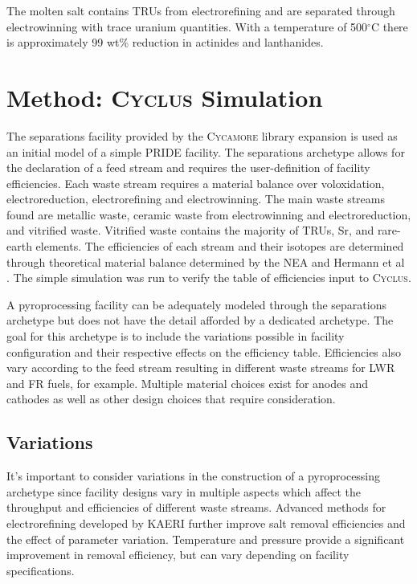 \documentclass{anstrans}
\newcommand{\Cyclus}{\textsc{Cyclus}\xspace}%
\newcommand{\Cycamore}{\textsc{Cycamore}\xspace}%
\begin{document}
The molten salt contains TRUs from electrorefining and are separated through electrowinning with trace uranium quantities. With a temperature of 500$^{\circ}$C there is approximately 99 wt\% reduction in actinides and lanthanides. 
\section{Method: \Cyclus Simulation}
The separations facility provided by the \Cycamore library expansion is used as an initial model of a simple PRIDE facility. The separations archetype allows for the declaration of a feed stream and requires the user-definition of facility efficiencies. Each waste stream requires a material balance over voloxidation, electroreduction, electrorefining and electrowinning. The main waste streams found are metallic waste, ceramic waste from electrowinning and electroreduction, and vitrified waste. Vitrified waste contains the majority of TRUs, Sr, and rare-earth elements. The efficiencies of each stream and their isotopes are determined through theoretical material balance determined by the NEA and Hermann et al \cite{flowsheet_1998,herrmann_separation_2010}. The simple simulation was run to verify the table of efficiencies input to \Cyclus.

A pyroprocessing facility can be adequately modeled through the separations archetype but does not have the detail afforded by a dedicated archetype. The goal for this archetype is to include the variations possible in facility configuration and their respective effects on the efficiency table. Efficiencies also vary according to the feed stream resulting in different waste streams for LWR and FR fuels, for example. Multiple material choices exist for anodes and cathodes as well as other design choices that require consideration. 

\subsection{Variations}
It's important to consider variations in the construction of a pyroprocessing archetype since facility designs vary in multiple aspects which affect the throughput and efficiencies of different waste streams. Advanced methods for electrorefining developed by KAERI \cite{lee_advanced_nodate} further improve salt removal efficiencies and the effect of parameter variation. Temperature and pressure provide a significant improvement in removal efficiency, but can vary depending on facility specifications. 
\end{document}
